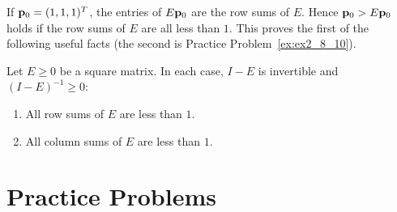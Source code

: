 \documentclass{ximera}
\begin{document}
If ${\bf p}_{0} = (1, 1, 1)^{T}$, the entries of $E{\bf p}_{0}$ are the row sums of $E$. Hence ${\bf p}_{0} > E{\bf p}_{0}$ holds if the row sums of $E$ are all less than $1$. This proves the first of the following useful facts (the second is Practice Problem~\ref{ex:ex2_8_10}).

\begin{corollary}\label{007090}
Let $E \geq 0$ be a square matrix. In each case, $I - E$ is invertible and $(I - E)^{-1} \geq 0$:

\begin{enumerate}
\item All row sums of $E$ are less than $1$.

\item All column sums of $E$ are less than $1$.

\end{enumerate}
\end{corollary}


\section*{Practice Problems}
\end{document}
